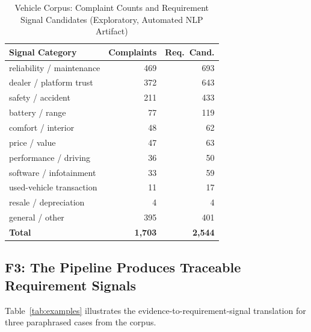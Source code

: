 \documentclass[conference]{IEEEtran}
\begin{document}
\begin{table}[htb]
\caption{Vehicle Corpus: Complaint Counts and Requirement Signal Candidates (Exploratory, Automated NLP Artifact)}
\label{tab:complaints}
\centering\small
\begin{tabular}{lrr}
\toprule
Signal Category & Complaints & Req.\ Cand. \\
\midrule
reliability / maintenance  & 469 & 693 \\
dealer / platform trust    & 372 & 643 \\
safety / accident          & 211 & 433 \\
battery / range            &  77 & 119 \\
comfort / interior         &  48 &  62 \\
price / value              &  47 &  63 \\
performance / driving      &  36 &  50 \\
software / infotainment    &  33 &  59 \\
used-vehicle transaction   &  11 &  17 \\
resale / depreciation      &   4 &   4 \\
general / other            & 395 & 401 \\
\midrule
\textbf{Total}             & \textbf{1,703} & \textbf{2,544} \\
\bottomrule
\end{tabular}
\end{table}

\subsection{F3: The Pipeline Produces Traceable Requirement Signals}

Table~\ref{tab:examples} illustrates the evidence-to-requirement-signal translation for three paraphrased cases from the corpus.
\end{document}
